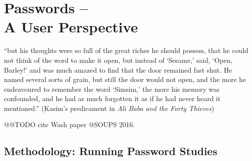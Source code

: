 \chapter[Passwords -- A User Perspective]{Passwords -- \\
	A User Perspective}\label{chap:rw:user_perspective}

``but his thoughts were so full of the great riches he should possess, that he could not think of the word to make it open, but instead of `Sesame,' said, `Open, Barley!' and was much amazed to find that the door remained fast shut. He named several sorts of grain, but still the door would not open, and the more he endeavoured to remember the word `Simsim,' the more his memory was confounded, and he had as much forgotten it as if he had never heard it mentioned.'' (Kasim's predicament in \textit{Ali Baba and the Forty Thieves})





@@TODO cite Wash paper @SOUPS 2016.

\cite{Bailey2014StatisticsReuse,Bojinov2010KamouflagePWM,Bonneau2015SecretsLies,Brown2004GeneratingPWs,Chiasson2009InterferencesGraphical,Conklin2004PWAuthenticationSystemPerspective,CSID2012PasswordHabits,Das2014TangledWeb,Dourish2004UserStrategiesEveryday,Florencio2014PasswordPortfoliosFiniteUser,Forget2015CYOA}
\cite{Gaw2005ReuseRecycle,Gaw2006PasswordManagement,Habib2017Blacklists,Haque2014Hierarchy,Hayashi2011DiaryStudyPWs,Huha2015UserReplaceablePasswords,Ives2004DominoEffectReuse,Katsini2017StrategiesGraphicalPasswords,Keith2009PassphraseDesign,Komanduri2011OfPasswordsAndPeople,Kothari2017PasswordLogbooks,Kuo2006HumanSelectionMnemonic,Li2017,Loutfi2015PasswordsOtherSideOfTheFence,Lyastani2016PWMangling,Notoatmodjo2007,Peisert2013PriciplesAuthentication,Riley2006WhatUsersKnowWhatTheyDo}
\cite{Shay2014ReligiousAunt,Shay2010EncounteringPasswordRequirements,Singh2007PasswordSharing,Stobert2014a,Stobert2015,Stobert2014PWMThatDoesntRemember,Stobert2014PasswordLifeCycle,Stobert2015ExpertPassword}
\cite{Ur2015PWCreationLab,Bruggen2013ModifiyngUnlockingBehavior,Veras2012VisualizingSemanticsPasswords,Wang2015ChinesePWs,Wash2016UnderstandingPasswordChoices,Yang2016MnemonicSentenceBased,ZhangKennedy2016RevisitingPasswordRules}

\section{Methodology: Running Password Studies}

